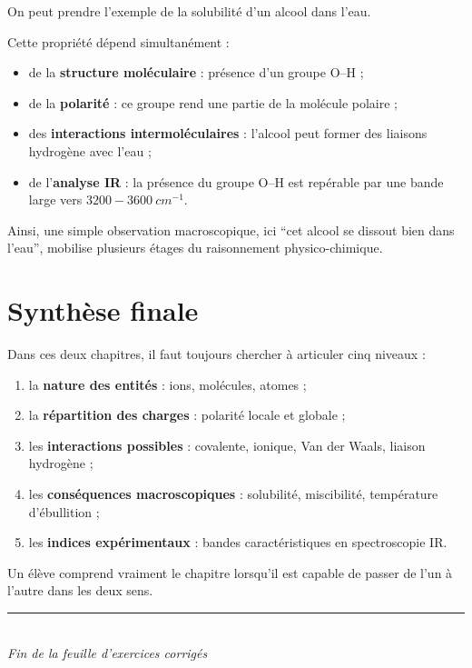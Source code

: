 \documentclass[11pt,a4paper]{article}
\begin{document}
\begin{corrigebox}
On peut prendre l'exemple de la solubilité d'un alcool dans l'eau.

Cette propriété dépend simultanément :
\begin{itemize}
    \item de la \textbf{structure moléculaire} : présence d'un groupe O--H ;
    \item de la \textbf{polarité} : ce groupe rend une partie de la molécule polaire ;
    \item des \textbf{interactions intermoléculaires} : l'alcool peut former des liaisons hydrogène avec l'eau ;
    \item de l'\textbf{analyse IR} : la présence du groupe O--H est repérable par une bande large vers \(3200-3600\ \si{cm^{-1}}\).
\end{itemize}

Ainsi, une simple observation macroscopique, ici ``cet alcool se dissout bien dans l'eau'', mobilise plusieurs étages du raisonnement physico-chimique.
\end{corrigebox}

\section{Synthèse finale}

\begin{bilanbox}
Dans ces deux chapitres, il faut toujours chercher à articuler cinq niveaux :

\begin{enumerate}
    \item la \textbf{nature des entités} : ions, molécules, atomes ;
    \item la \textbf{répartition des charges} : polarité locale et globale ;
    \item les \textbf{interactions possibles} : covalente, ionique, Van der Waals, liaison hydrogène ;
    \item les \textbf{conséquences macroscopiques} : solubilité, miscibilité, température d'ébullition ;
    \item les \textbf{indices expérimentaux} : bandes caractéristiques en spectroscopie IR.
\end{enumerate}

Un élève comprend vraiment le chapitre lorsqu'il est capable de passer de l'un à l'autre dans les deux sens.
\end{bilanbox}

\vfill

\begin{center}
\rule{0.82\linewidth}{0.5pt}\\
\textit{Fin de la feuille d'exercices corrigés}
\end{center}
\end{document}
